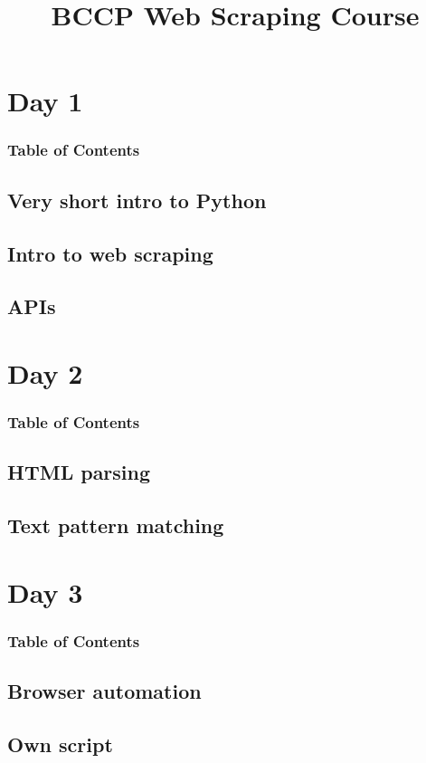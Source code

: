 \documentclass[english,aspectratio=169]{beamer}
\begin{document}
\title[Web scraping]{BCCP Web Scraping Course}
\titlegraphic{}


\date[]{}

\begin{frame}
    \titlepage
\end{frame}

\section{Day 1}
\label{sec:day1}


\begin{frame}
    \frametitle{Table of Contents}
    \tableofcontents[currentsection]
\end{frame}

\subsection{Very short intro to Python}
\label{sec:intropython}


\subsection{Intro to web scraping}
\label{sec:introwebscraping}



\subsection{APIs}
\label{sec:apis}


\section{Day 2}

\begin{frame}
    \frametitle{Table of Contents}
    \tableofcontents[currentsection]
\end{frame}

\subsection{HTML parsing}



\subsection{Text pattern matching}



\section{Day 3}

\begin{frame}
    \frametitle{Table of Contents}
    \tableofcontents[currentsection]
\end{frame}

\subsection{Browser automation}



\subsection{Own script}
\end{document}
